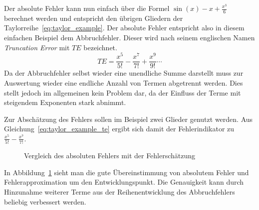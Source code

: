 Der absolute Fehler kann nun einfach über die Formel $\sin(x) - x + \frac{x^3}{6}$
berechnet werden und entspricht den übrigen Gliedern der Taylorreihe~\eqref{eq:taylor_example}.
Der absolute Fehler entspricht also in diesem einfachen Beispiel dem Abbruchfehler.
Dieser wird nach seinem englischen Namen \textit{Truncation Error} mit $TE$ bezeichnet.
\begin{equation}
  TE = \frac{x^5}{5!} -\frac{x^7}{7!} +\frac{x^9}{9!}\cdots
 \label{eq:taylor_example_te}
\end{equation}
Da der Abbruchfehler selbst wieder eine unendliche Summe darstellt muss zur Auswertung
wieder eine endliche Anzahl von Termen abgetrennt werden. Dies stellt jedoch im allgemeinen
kein Problem dar, da der Einfluss der Terme mit steigendem Exponenten stark abnimmt.

Zur Abschätzung des Fehlers sollen im Beispiel zwei Glieder genutzt werden. Aus
Gleichung~\eqref{eq:taylor_example_te} ergibt sich damit der Fehlerindikator zu
$\frac{x^5}{5!} -\frac{x^7}{7!} $.
\begin{figure}[h]
\centering
\caption{Vergleich des absoluten Fehlers mit der Fehlerschätzung}
 \label{fig:taylor_example_te}
\end{figure}
In Abbildung~\ref{fig:taylor_example_te} sieht man die gute Übereinstimmung von absolutem Fehler und Fehlerapproximation um den Entwicklungspunkt. Die Genauigkeit kann durch Hinzunahme weiterer Terme aus der Reihenentwicklung des Abbruchfehlers beliebig verbessert werden.
